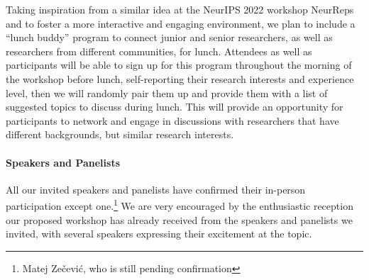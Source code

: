 \documentclass{article}
\begin{document}


Taking inspiration from a similar idea at the NeurIPS 2022 workshop NeurReps and to foster a more interactive and engaging environment, we plan to include a ``lunch buddy'' program to connect junior and senior researchers, as well as researchers from different communities, for lunch. 
Attendees as well as participants will be able to sign up for this program throughout the morning of the workshop before lunch, self-reporting their research interests and experience level, then we will randomly pair them up and provide them with a list of suggested topics to discuss during lunch.
This will provide an opportunity for participants to network and engage in discussions with researchers that have different backgrounds, but similar research interests.





\paragraph{Speakers and Panelists}

All our invited speakers and panelists have confirmed their in-person participation except one.\footnote{Matej Zečević, who is still pending confirmation}
We are very encouraged by the enthusiastic reception our proposed workshop has already received from the speakers and panelists we invited, with several speakers expressing their excitement at the topic. %
\end{document}
